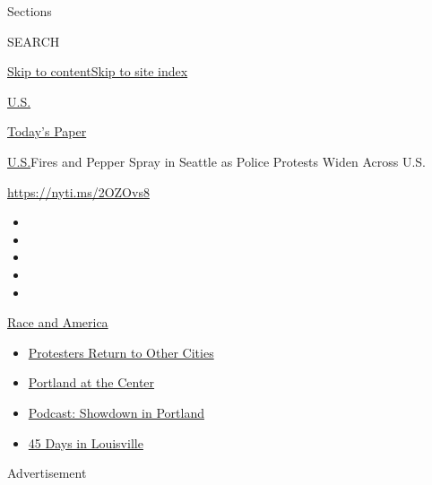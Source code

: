 Sections

SEARCH

\protect\hyperlink{site-content}{Skip to
content}\protect\hyperlink{site-index}{Skip to site index}

\href{https://www.nytimes.com/section/us}{U.S.}

\href{https://myaccount.nytimes.com/auth/login?response_type=cookie\&client_id=vi}{}

\href{https://www.nytimes.com/section/todayspaper}{Today's Paper}

\href{/section/us}{U.S.}\textbar{}Fires and Pepper Spray in Seattle as
Police Protests Widen Across U.S.

\url{https://nyti.ms/2OZOvs8}

\begin{itemize}
\item
\item
\item
\item
\item
\end{itemize}

\href{https://www.nytimes.com/news-event/george-floyd-protests-minneapolis-new-york-los-angeles?action=click\&pgtype=Article\&state=default\&region=TOP_BANNER\&context=storylines_menu}{Race
and America}

\begin{itemize}
\tightlist
\item
  \href{https://www.nytimes.com/2020/07/26/us/protests-portland-seattle-trump.html?action=click\&pgtype=Article\&state=default\&region=TOP_BANNER\&context=storylines_menu}{Protesters
  Return to Other Cities}
\item
  \href{https://www.nytimes.com/2020/07/24/us/portland-oregon-protests-white-race.html?action=click\&pgtype=Article\&state=default\&region=TOP_BANNER\&context=storylines_menu}{Portland
  at the Center}
\item
  \href{https://www.nytimes.com/2020/07/23/podcasts/the-daily/portland-protests.html?action=click\&pgtype=Article\&state=default\&region=TOP_BANNER\&context=storylines_menu}{Podcast:
  Showdown in Portland}
\item
  \href{https://www.nytimes.com/interactive/2020/07/16/us/black-lives-matter-protests-louisville-breonna-taylor.html?action=click\&pgtype=Article\&state=default\&region=TOP_BANNER\&context=storylines_menu}{45
  Days in Louisville}
\end{itemize}

Advertisement

